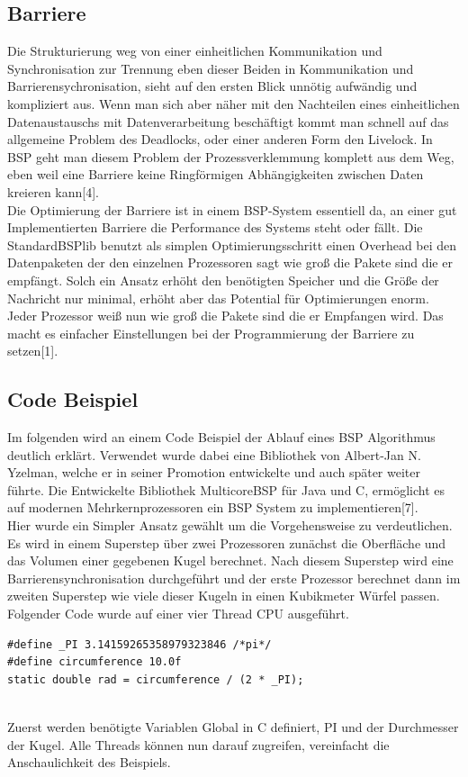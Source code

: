\documentclass[a4paper,10pt]{scrartcl}
\begin{document}
\subsection{Barriere}
Die Strukturierung weg von einer einheitlichen Kommunikation und Synchronisation zur Trennung eben dieser Beiden in Kommunikation und Barrierensychronisation, sieht auf den ersten Blick unnötig aufwändig und kompliziert aus. Wenn man sich aber näher mit den Nachteilen eines einheitlichen Datenaustauschs mit Datenverarbeitung beschäftigt kommt man schnell auf das allgemeine Problem des Deadlocks, oder 	einer anderen Form den Livelock. In BSP geht man diesem Problem der Prozessverklemmung komplett aus dem Weg, eben weil eine Barriere keine Ringförmigen Abhängigkeiten zwischen Daten kreieren kann[4].\\
Die Optimierung der Barriere ist in einem BSP-System essentiell da, an einer gut Implementierten Barriere die Performance des Systems steht oder fällt. Die StandardBSPlib benutzt als simplen Optimierungsschritt einen Overhead bei den Datenpaketen der den einzelnen Prozessoren sagt wie groß die Pakete sind die er empfängt. Solch ein Ansatz erhöht den benötigten Speicher und die Größe der Nachricht nur minimal, erhöht aber das Potential für Optimierungen enorm. Jeder Prozessor weiß nun wie groß die Pakete sind die er Empfangen wird. Das macht es einfacher Einstellungen bei der Programmierung der Barriere zu setzen[1].
\newpage

\subsection{Code Beispiel}
Im folgenden wird an einem Code Beispiel der Ablauf eines BSP Algorithmus deutlich erklärt. Verwendet wurde dabei eine Bibliothek von Albert-Jan N. Yzelman, welche er in seiner Promotion entwickelte und auch später weiter führte. Die Entwickelte Bibliothek MulticoreBSP für Java und C, ermöglicht es auf modernen Mehrkernprozessoren ein BSP System zu implementieren[7].\\
Hier wurde ein Simpler Ansatz gewählt um die Vorgehensweise zu verdeutlichen. Es wird in einem Superstep über zwei Prozessoren zunächst die Oberfläche und das Volumen einer gegebenen Kugel berechnet. Nach diesem Superstep wird eine Barrierensynchronisation durchgeführt und der erste Prozessor berechnet dann im zweiten Superstep wie viele dieser Kugeln in einen Kubikmeter Würfel passen. Folgender Code wurde auf einer vier Thread CPU ausgeführt.
\begin{lstlisting}
#define _PI 3.14159265358979323846 /*pi*/
#define circumference 10.0f
static double rad = circumference / (2 * _PI);
   
\end{lstlisting}
Zuerst werden benötigte Variablen Global in C definiert, PI und der Durchmesser der Kugel. Alle Threads können nun darauf zugreifen, vereinfacht die Anschaulichkeit des Beispiels.
\end{document}
